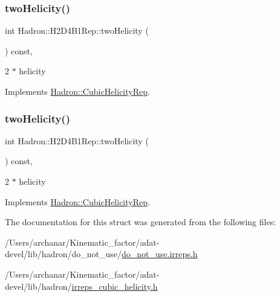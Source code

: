 \subsubsection{\texorpdfstring{twoHelicity()}{twoHelicity()}\hspace{0.1cm}{\footnotesize\ttfamily [2/3]}}
{\footnotesize\ttfamily int Hadron\+::\+H2\+D4\+B1\+Rep\+::two\+Helicity (\begin{DoxyParamCaption}{ }\end{DoxyParamCaption}) const\hspace{0.3cm}{\ttfamily [inline]}, {\ttfamily [virtual]}}

2 $\ast$ helicity 

Implements \mbox{\hyperlink{structHadron_1_1CubicHelicityRep_af507aa56fc2747eacc8cb6c96db31ecc}{Hadron\+::\+Cubic\+Helicity\+Rep}}.

\mbox{\label{structHadron_1_1H2D4B1Rep_af76e49b62cabfe0d55dec970eca37ca3}} 
\subsubsection{\texorpdfstring{twoHelicity()}{twoHelicity()}\hspace{0.1cm}{\footnotesize\ttfamily [3/3]}}
{\footnotesize\ttfamily int Hadron\+::\+H2\+D4\+B1\+Rep\+::two\+Helicity (\begin{DoxyParamCaption}{ }\end{DoxyParamCaption}) const\hspace{0.3cm}{\ttfamily [inline]}, {\ttfamily [virtual]}}

2 $\ast$ helicity 

Implements \mbox{\hyperlink{structHadron_1_1CubicHelicityRep_af507aa56fc2747eacc8cb6c96db31ecc}{Hadron\+::\+Cubic\+Helicity\+Rep}}.



The documentation for this struct was generated from the following files\+:\begin{DoxyCompactItemize}
\item 
/\+Users/archanar/\+Kinematic\+\_\+factor/adat-\/devel/lib/hadron/do\+\_\+not\+\_\+use/\mbox{\hyperlink{adat-devel_2lib_2hadron_2do__not__use_2do__not__use_8irreps_8h}{do\+\_\+not\+\_\+use.\+irreps.\+h}}\item 
/\+Users/archanar/\+Kinematic\+\_\+factor/adat-\/devel/lib/hadron/\mbox{\hyperlink{adat-devel_2lib_2hadron_2irreps__cubic__helicity_8h}{irreps\+\_\+cubic\+\_\+helicity.\+h}}\end{DoxyCompactItemize}
